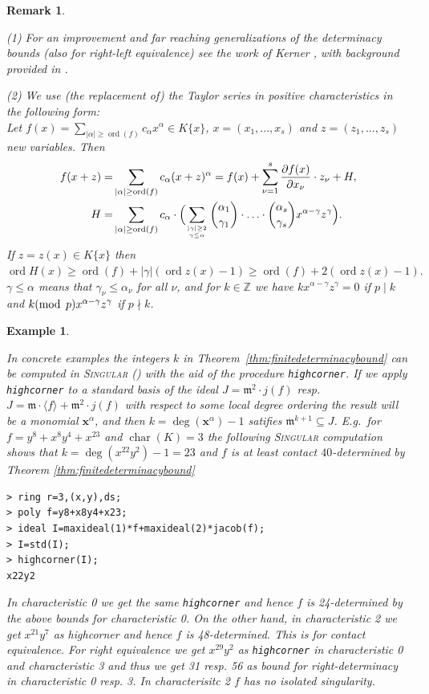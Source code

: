 \documentclass[11pt]{article}
\DeclareMathOperator{\modular}{mod}
\DeclareMathOperator{\ord}{ord}
\DeclareMathOperator{\Char}{char}
\newtheorem{Remark}[Definition]{Remark}
\newtheorem{Example}[Definition]{Example}
\newcommand{\Z}{{\mathbb Z}}
\newcommand{\fm}{\mathfrak{m}}
\newcommand{\bx}{\boldsymbol{x}}
\begin{document}
\begin{Remark}\label{rm.taylor}{\em
 {(1) For an improvement and far reaching generalizations of the determinacy bounds (also for right-left equivalence) see the work of Kerner 
\cite{Ker}, with background provided in \cite{BGK}.}

(2) We use (the replacement of) the Taylor series in positive characteristics in the following form:\\
Let $f(x)= \sum\limits_{\left| {{\alpha}}  \right| \ge \ord(f)} {c_\alpha  x^{{\alpha}}}\in K\{x\}$, $x=(x_1,...,x_s)$ and ${z}=(z_1,...,z_s)$ new variables. Then  
\begin{align*}
      f({x+z}) =& \sum_{|\alpha|\ge \ord(f)}c_\alpha(x+z)^\alpha
	=f({ x})+
	\sum\limits_{\nu = 1}^s {\frac{{\partial f({x})}}{{\partial x_\nu }}\cdot z_\nu }  + H,\\
H=&	\sum\limits_{\left| \alpha  \right| \ge \ord(f)} {c_\alpha\cdot  
\Big ( 
{\sum\limits_{\left| \gamma  \right| \ge 2 \atop \gamma  \le \alpha } 
{\binom {\alpha _1 } { \gamma _1} \cdot\ldots\cdot
\binom {\alpha _s } { \gamma _s}{x}^{\alpha  - \gamma }{z}^\gamma} }
\Big )}.
\end{align*}
\noindent
If $z=z(x) \in K\{x\}$ then $\ord H(x) \ge  \ord(f) + |\gamma|  (\ord z(x)-1) \ge \ord(f) + 2  (\ord z(x)-1).$
$\gamma\le \alpha$ means that $\gamma_\nu\le\alpha_\nu$ for all $\nu$, and for $k\in \Z$
we have $k{ x}^{\alpha  - \gamma }{ z}^\gamma= 0$ if   $p\mid k$ and  $k {(\modular\hskip 3pt p)}{ x}^{\alpha  - \gamma }{ z}^\gamma$ if  $p\nmid k$. 
}
\end{Remark}

\begin{Example}   \label{ex:determ}  {\em
In concrete examples the integers $k$ in
       Theorem~\ref{thm:finitedeterminacybound} can be computed in 
       \textsc{Singular} (\cite{DGPS}) with the aid of the procedure
       \texttt{highcorner}. If we apply \texttt{highcorner} to a
       standard basis of the ideal $J=\fm^2\cdot j(f)$ resp.\ $J=\fm\cdot\langle
       f\rangle+\fm^2\cdot j(f)$ with respect to some local degree
       ordering the result will be a monomial 
       $\bx^\alpha$, and then $k=\deg(\bx^\alpha)-1$
        {satifies $\fm^{k+1}\subseteq J$.} 
       E.g.\ for
       $f=y^8+x^8y^4+x^{23}$ and $\Char(K)=3$ the following
       \textsc{Singular} computation shows that
       $k=\deg(x^{22}y^2)-1=23$ and $f$ is at least contact $40$-determined by Theorem \ref{thm:finitedeterminacybound}
\begin{verbatim}
> ring r=3,(x,y),ds;
> poly f=y8+x8y4+x23;
> ideal I=maxideal(1)*f+maxideal(2)*jacob(f);
> I=std(I);
> highcorner(I);
x22y2
\end{verbatim}   
In characteristic 0 we get the same  \texttt{highcorner} and hence $f$ is 24-determined  {by the above bounds for characteristic 0}.
On the other hand,  in characteristic 2  we get  $x^{21}y^7$ as highcorner and hence $f$ is 48-determined. This is for contact equivalence. For right equivalence we get $x^{29}y^2$ as 
 \texttt{highcorner} in characteristic 0 and characteristic 3 and thus we get 31 resp. 56 as bound for right-determinacy in characteristic 0 resp. 3.
 In characterisitc 2 $f$ has no isolated singularity.
 }
\end{Example} 
   
\end{document}
